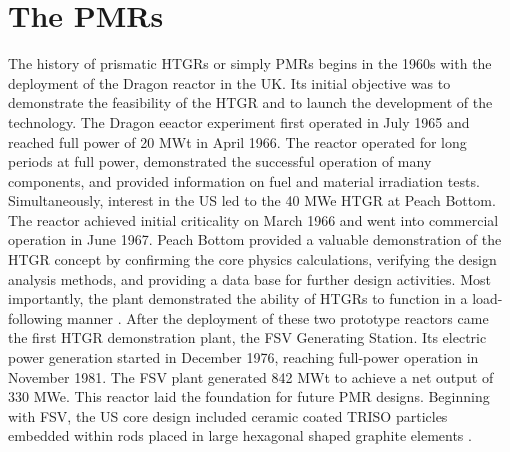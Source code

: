 \documentclass[11pt,letterpaper]{article}
\begin{document}

\section{The \glspl{PMR}}

The history of prismatic \glspl{HTGR} or simply \glspl{PMR} begins in the 1960s with the deployment of the Dragon reactor in the \gls{UK}.
Its initial objective was to demonstrate the feasibility of the \gls{HTGR} and to launch the development of the technology.
The Dragon eeactor experiment first operated in July 1965 and reached full power of 20 MWt in April 1966.
The reactor operated for long periods at full power, demonstrated the successful operation of many components, and provided information on fuel and material irradiation tests.
Simultaneously, interest in the \gls{US} led to the 40 MWe \gls{HTGR} at Peach Bottom.
The reactor achieved initial criticality on March 1966 and went into commercial operation in June 1967.
Peach Bottom provided a valuable demonstration of the \gls{HTGR} concept by confirming the core physics calculations, verifying the design analysis methods, and providing a data base for further design activities.
Most importantly, the plant demonstrated the ability of \glspl{HTGR} to function in a load-following manner \cite{brey_development_2001}.
After the deployment of these two prototype reactors came the first \gls{HTGR} demonstration plant, the \gls{FSV} Generating Station.
Its electric power generation started in December 1976, reaching full-power operation in November 1981.
The \gls{FSV} plant generated 842 MWt to achieve a net output of 330 MWe.
This reactor laid the foundation for future \gls{PMR} designs.
Beginning with \gls{FSV}, the \gls{US} core design included ceramic coated \gls{TRISO} particles embedded within rods placed in large hexagonal shaped graphite elements \cite{brey_development_2001}.
\end{document}
